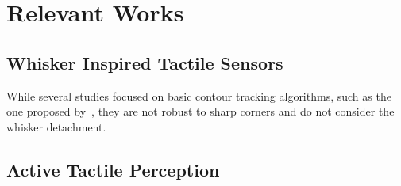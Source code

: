 

\chapter{Relevant Works}

\section{Whisker Inspired Tactile Sensors}
While several studies focused on basic contour tracking algorithms, such as the one proposed by~\cite{lin2022whiskerinspiredtactilesensingcontact}, they are not robust to sharp corners and do not consider the whisker detachment.


\section{Active Tactile Perception}


